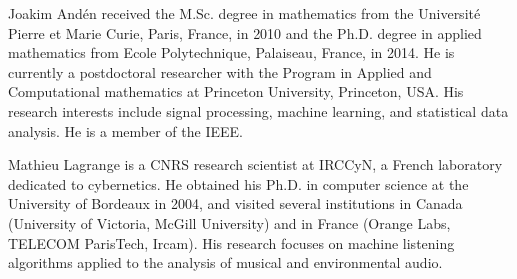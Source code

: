 \documentclass[journal]{IEEEtran}
\begin{document}
\begin{IEEEbiography}{Joakim And\'en}
received the M.Sc. degree in mathematics from the Universit\'e Pierre et Marie Curie, Paris, France, in 2010 and the Ph.D. degree in applied mathematics from Ecole Polytechnique, Palaiseau, France, in 2014. He is currently a postdoctoral researcher with the Program in Applied and Computational mathematics at Princeton University, Princeton, USA. His research interests include signal processing, machine learning, and statistical data analysis. He is a member of the IEEE.

\end{IEEEbiography}

\begin{IEEEbiography}{Mathieu Lagrange} is a CNRS research scientist at IRCCyN, a French laboratory dedicated to cybernetics. He obtained his Ph.D. in computer science at the University of Bordeaux in 2004, and visited several institutions in Canada (University of Victoria, McGill University) and in France (Orange Labs, TELECOM ParisTech, Ircam). His research focuses on machine listening algorithms applied to the analysis of musical and environmental audio.
\end{IEEEbiography}

% 
\end{document}

